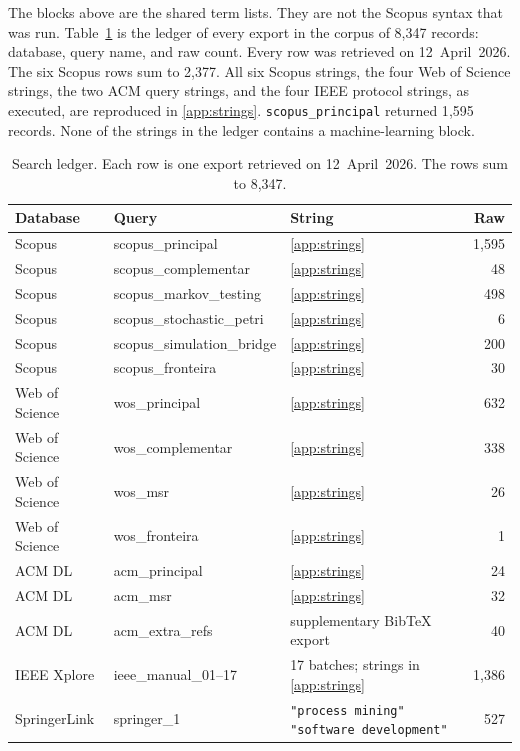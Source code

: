 The blocks above are the shared term lists. They are not the Scopus syntax
that was run. Table~\ref{tab:query-ledger} is the ledger of every export in
the corpus of 8{,}347 records: database, query name, and raw count. Every
row was retrieved on 12~April~2026. The six Scopus rows sum to 2{,}377.
All six Scopus strings, the four Web of Science strings, the two ACM
query strings, and the four IEEE protocol strings, as executed, are
reproduced in \ref{app:strings}. \texttt{scopus\_principal} returned
1{,}595 records. None of the strings in the ledger contains a
machine-learning block.

\begin{table}[htbp]
\centering
\caption{Search ledger. Each row is one export retrieved on 12~April~2026.
The rows sum to 8{,}347.}
\label{tab:query-ledger}
\small
\setlength{\tabcolsep}{3pt}
\begin{tabular}{llp{5.9cm}r}
\toprule
\textbf{Database} & \textbf{Query} & \textbf{String} & \textbf{Raw} \\
\midrule
Scopus & scopus\_principal & \ref{app:strings} & 1{,}595 \\
Scopus & scopus\_complementar & \ref{app:strings} & 48 \\
Scopus & scopus\_markov\_testing & \ref{app:strings} & 498 \\
Scopus & scopus\_stochastic\_petri & \ref{app:strings} & 6 \\
Scopus & scopus\_simulation\_bridge & \ref{app:strings} & 200 \\
Scopus & scopus\_fronteira & \ref{app:strings} & 30 \\
\midrule
Web of Science & wos\_principal & \ref{app:strings} & 632 \\
Web of Science & wos\_complementar & \ref{app:strings} & 338 \\
Web of Science & wos\_msr & \ref{app:strings} & 26 \\
Web of Science & wos\_fronteira & \ref{app:strings} & 1 \\
\midrule
ACM DL & acm\_principal & \ref{app:strings} & 24 \\
ACM DL & acm\_msr & \ref{app:strings} & 32 \\
ACM DL & acm\_extra\_refs & supplementary Bib\TeX{} export & 40 \\
\midrule
IEEE Xplore & ieee\_manual\_01--17 & 17 batches; strings in \ref{app:strings} & 1{,}386 \\
\midrule
SpringerLink & springer\_1 & \texttt{"process mining" "software development"} & 527 \\

\end{tabular}
\end{table}
